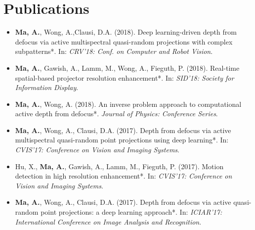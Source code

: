 \section*{Publications}
    \vspace{\postsubhead}
    \begin{adjustwidth}{\indentleft}{\indentright}
        \begin{itemize}
            
            \item \textbf{Ma, A.}, Wong, A.,Clausi, D.A. (2018). Deep learning-driven depth from defocus via active multispectral quasi-random projections with complex subpatterns*. In: \emph{CRV'18: Conf. on Computer and Robot Vision}.
            
            \item \textbf{Ma, A.}, Gawish, A., Lamm, M., Wong, A., Fieguth, P. (2018). Real-time spatial-based projector resolution enhancement*. In: \emph{SID'18: Society for Information Display}.
            
            \item \textbf{Ma, A.}, Wong, A. (2018). An inverse problem approach to computational active depth from defocus*. \emph{Journal of Physics: Conference Series}.
            
            \item \textbf{Ma, A.}, Wong, A., Clausi, D.A. (2017). Depth from defocus via active multispectral quasi-random point projections using deep learning*. In: \emph{CVIS'17: Conference on Vision and Imaging Systems}.
           
            \item Hu, X., \textbf{Ma, A.}, Gawish, A., Lamm, M., Fieguth, P. (2017). Motion detection in high resolution enhancement*. In: \emph{CVIS'17: Conference on Vision and Imaging Systems}.
            
            \item \textbf{Ma, A.}, Wong, A., Clausi, D.A. (2017). Depth from defocus via active quasi-random point projections: a deep learning approach*. In: \emph{ICIAR'17: International Conference on Image Analysis and Recognition}.
            

\end{itemize}
\end{adjustwidth}
